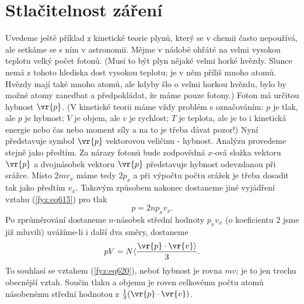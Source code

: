   \section{Stlačitelnost záření}\label{fyz:IchapIXLsecIII}
    Uvedeme ještě příklad z kinetické teorie plynů, který se v chemii často nepoužívá, ale setkáme
    se s ním v astronomii. Mějme v nádobě ohřáté na velmi vysokou teplotu velký počet fotonů. (Musí
    to být plyn nějaké velmi horké hvězdy. Slunce nemá z tohoto hlediska dost vysokou teplotu; je v
    něm příliš mnoho atomů. Hvězdy mají také mnoho atomů, ale kdyby šlo o velmi horkou hvězdu, bylo
    by možné atomy zanedbat a předpokládat, že máme pouze fotony.) Foton má určitou hybnost
    \(\vr{p}\). (V kinetické teorii máme vždy problém s označováním: \(p\) je tlak, ale \(p\) je
    hybnost; \(V\) je objem, ale \(v\) je rychlost; \(T\) je teplota, ale je to i kinetická energie
    nebo čas nebo moment síly a na to je třeba dávat pozor!) Nyní představuje symbol \(\vr{p}\)
    vektorovou veličinu - hybnost. Analýzu provedeme stejně jako předtím. Za nárazy fotonů bude
    zodpovědná \(x\)-ová složka vektoru \(\vr{p}\)  a dvojnásobek vektoru \(\vr{p}\)  představuje
    hybnost odevzdanou při srážce. Místo \(2mv_x\) máme tedy \(2p_x\) a při výpočtu počtu srážek je
    třeba dosadit tak jako předtím \(v_x\). Takovým způsobem nakonec dostaneme jiné vyjádření vztahu
    (\ref{fyz:eq615}) pro tlak
    \begin{equation}\label{fyz:eq626}
      p = 2np_xv_x.
    \end{equation}
    Po zprůměrování dostaneme \(n\)-násobek střední hodnoty \(p_xv_x\) (o koeficientu 2 jsme již
    mluvili) uvážíme-li i další dva směry, dostaneme
    \begin{equation}\label{fyz:eq681}
      pV=N\langle \frac{\vr{p}\cdot\vr{v}\rangle}{3}.
    \end{equation}  
    To souhlasí se vztahem (\ref{fyz:eq620}), neboť hybnost je rovna \(mv\); je to jen trochu
    obecnější vztah. Součin tlaku a objemu je roven celkovému počtu atomů násobenému střední
    hodnotou z \(\frac{1}{3}(\vr{p}\cdot\vr{v})\).

